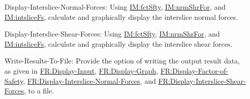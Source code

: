 \documentclass[12pt]{article}
\begin{document}
\begin{itemize}
\item[Display-Interslice-Normal-Forces:\phantomsection\label{displayNormal}]{Using \hyperref[IM:fctSfty]{IM:fctSfty}, \hyperref[IM:nrmShrFor]{IM:nrmShrFor}, and \hyperref[IM:intsliceFs]{IM:intsliceFs}, calculate and graphically display the interslice normal forces.}
\item[Display-Interslice-Shear-Forces:\phantomsection\label{displayShear}]{Using \hyperref[IM:fctSfty]{IM:fctSfty}, \hyperref[IM:nrmShrFor]{IM:nrmShrFor}, and \hyperref[IM:intsliceFs]{IM:intsliceFs}, calculate and graphically display the interslice shear forces.}
\item[Write-Results-To-File:\phantomsection\label{writeToFile}]{Provide the option of writing the output result data, as given in \hyperref[displayInput]{FR:Display-Input}, \hyperref[displayGraph]{FR:Display-Graph}, \hyperref[displayFS]{FR:Display-Factor-of-Safety}, \hyperref[displayNormal]{FR:Display-Interslice-Normal-Forces}, and \hyperref[displayShear]{FR:Display-Interslice-Shear-Forces}, to a file.}
\end{itemize}
\end{document}
